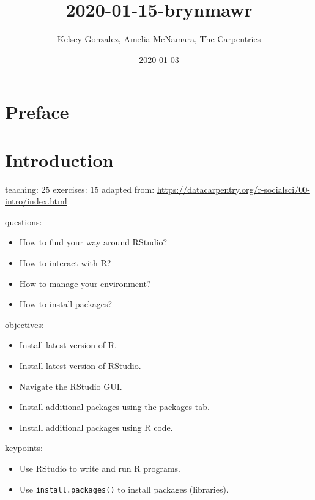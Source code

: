\documentclass[]{book}
\title{2020-01-15-brynmawr}
\author{Kelsey Gonzalez, Amelia McNamara, The Carpentries}
\date{2020-01-03}
\providecommand{\tightlist}{%
  \setlength{\itemsep}{0pt}\setlength{\parskip}{0pt}}
\begin{document}
\maketitle

{
\setcounter{tocdepth}{1}
\tableofcontents
}
\chapter*{Preface}\label{preface}

\chapter{Introduction}\label{introduction}

teaching: 25 exercises: 15 adapted from:
\url{https://datacarpentry.org/r-socialsci/00-intro/index.html}

questions:

\begin{itemize}
\tightlist
\item
  How to find your way around RStudio?\\
\item
  How to interact with R?\\
\item
  How to manage your environment?\\
\item
  How to install packages?
\end{itemize}

objectives:

\begin{itemize}
\tightlist
\item
  Install latest version of R.\\
\item
  Install latest version of RStudio.\\
\item
  Navigate the RStudio GUI.\\
\item
  Install additional packages using the packages tab.\\
\item
  Install additional packages using R code.
\end{itemize}

keypoints:

\begin{itemize}
\tightlist
\item
  Use RStudio to write and run R programs.\\
\item
  Use \texttt{install.packages()} to install packages (libraries).
\end{itemize}
\end{document}
